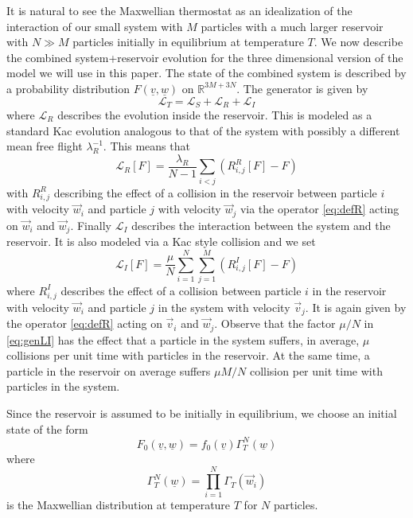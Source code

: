 \documentclass{article}
\renewcommand\v[1]{\vec{#1}}
\newcommand\uv{{\underline v}}
\newcommand\uw{{\underline w}}
\begin{document}
It is natural to see the Maxwellian thermostat as an idealization of the interaction of our small system with $M$
particles with a much larger reservoir with $N\gg M$ particles initially in equilibrium at temperature $T$. We now
describe the combined system+reservoir evolution for the three dimensional version of the model we will use in this
paper. The state of the combined system is described by a probability distribution $F(\uv, \uw)$ on $\mathds R^{3M+3N}$.
The generator is given by
\begin{equation}\label{eq:gen1res}
 \mathcal L_T=\mathcal L_S +\mathcal  L_R + \mathcal L_I
\end{equation}
where $\mathcal L_R$ describes the evolution inside the reservoir. This is modeled as a standard Kac evolution analogous
to that of the system with possibly a different mean free flight $\lambda_R^{-1}$. This means that
\begin{equation}\label{eq:genLR}
 \mathcal L_R[F]=\frac{\lambda_R}{N-1}\sum_{i<j} (R_{i,j}^R[F]-F)
\end{equation}
with $R_{i,j}^R$ describing the effect of a collision in the reservoir between particle $i$ with velocity $\v w_i$ and
particle $j$ with velocity $\v w_j$ via the operator \eqref{eq:defR} acting on $\vec w_i$ and $\vec w_j$. Finally
$\mathcal L_I$ describes the interaction between the system and the reservoir. It is also modeled via a Kac style
collision and we set
\begin{equation}\label{eq:genLI}
 \mathcal L_I[F]=\frac \mu N\sum_{i=1}^N\sum_{j=1}^M (R_{i,j}^I[F]-F)
\end{equation}
where $R_{i,j}^I$ describes the effect of a collision between particle $i$ in the reservoir with velocity $\v w_i$ and
particle $j$ in the system with velocity $\v v_j$. It is again given by the operator \eqref{eq:defR} acting on $\vec
v_i$ and $\vec w_j$. Observe that the factor $\mu/N$ in \eqref{eq:genLI} has the effect that a particle in the system
suffers, in average, $\mu$ collisions per unit time with particles in the reservoir. At the same time, a particle in the
reservoir on average suffers $\mu M/N$ collision per unit time with particles in the system.

Since the reservoir is assumed to be initially in equilibrium, we choose an initial state of the form
\begin{equation}\label{eq:ini1}
 F_0(\underline v,\underline w)=f_0(\underline v)\Gamma_T^N(\underline w)
\end{equation}
where
\[
 \Gamma_T^N(\underline w)=\prod_{i=1}^N \Gamma_T(\vec w_i)
\]
is the Maxwellian distribution at temperature $T$ for $N$ particles. 
\end{document}

